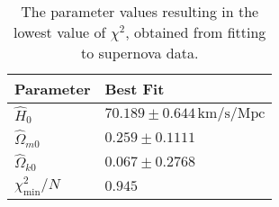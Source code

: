 \begin{table}[ht]
\centering
\caption{The parameter values resulting in the lowest value of $\chi^2$, obtained from fitting to supernova data.}
\label{tab:M1:results:best_fit_supernova}
\begin{tabular}{ll}
\toprule
              Parameter &                               Best Fit \\
\midrule
            $\hat{H}_0$ & $ 70.189 \pm 0.644\,\mathrm{km/s/Mpc}$ \\
    $\hat{\Omega}_{m0}$ &                    $ 0.259 \pm 0.1111$ \\
    $\hat{\Omega}_{k0}$ &                    $ 0.067 \pm 0.2768$ \\
$\chi_\mathrm{min}^2/N$ &                                $0.945$ \\
\bottomrule
\end{tabular}
\end{table}
